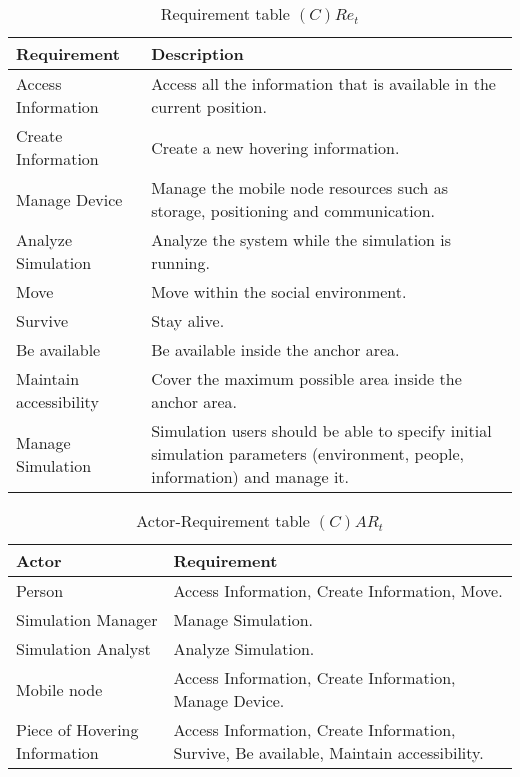 \begin{table}[H]
	\centering
	\begin{tabular}{|p{4cm}|p{8cm}|}
			\hline
			\textbf{Requirement} & \textbf{Description} \\
			\hline
			Access Information & Access all the information that is available in the
			current position. \\
			\hline
			Create Information & Create a new hovering information. \\
			\hline
			Manage Device & Manage the mobile node resources such as storage,
			positioning and communication.  \\
			\hline
			Analyze Simulation & Analyze the system while the simulation is running.
			\\
			\hline
			Move & Move within the social environment. \\
			\hline
			Survive & Stay alive. \\
			\hline
			Be available & Be available inside the anchor area. \\
			\hline
			Maintain accessibility & Cover the maximum possible area inside the
			anchor area. \\
			\hline
			Manage Simulation & Simulation users should be able to specify initial
			simulation parameters (environment, people, information) and manage it.
			\\
			\hline
		\end{tabular}
	\caption{Requirement table $(C)Re_t$}
	\label{tab:cact}
\end{table}

\begin{table}[H]
	\centering
	\begin{tabular}{|p{4cm}|p{8cm}|}
			\hline
			\textbf{Actor} & \textbf{Requirement} \\
			\hline
			Person & Access Information, Create Information, Move. \\
			\hline
			Simulation Manager & Manage Simulation. \\
			\hline
			Simulation Analyst & Analyze Simulation. \\
			\hline
			Mobile node & Access Information, Create Information, Manage Device. \\
			\hline
			Piece of Hovering Information & Access Information, Create Information,
			Survive, Be available, Maintain accessibility. \\
			\hline
		\end{tabular}
	\caption{Actor-Requirement table $(C)AR_t$}
	\label{tab:cart}
\end{table}

